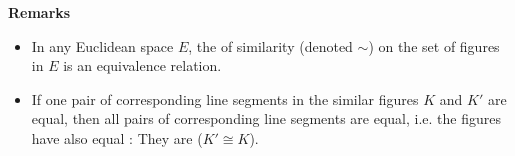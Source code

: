 \documentclass[12pt]{article}
\theoremstyle{definition}
\begin{document}
\textbf{Remarks}
\begin{itemize}
\item In any Euclidean space $E$, the  of similarity (denoted $\sim$) on the set of figures in $E$ is an equivalence relation.
\item If one pair of corresponding line segments in the similar figures $K$ and $K'$ are equal, then all pairs of corresponding line segments are equal, i.e. the figures have also equal : They are  ($K' \cong K$).
\end{itemize}
\end{document}
